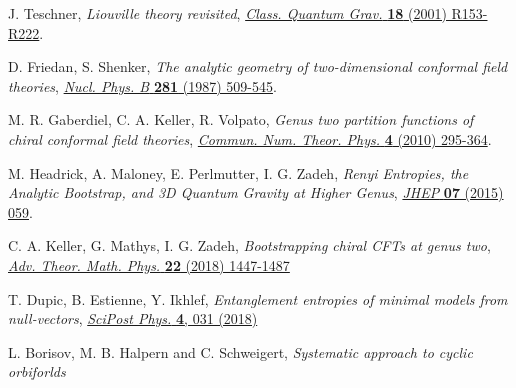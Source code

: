 \documentclass[a4paper,11pt]{article}
\begin{document}
\begin{thebibliography}{99}
 J. Teschner, \emph{Liouville theory revisited}, \href{https://doi.org/10.1088/0264-9381/18/23/201}{\emph{Class. Quantum Grav.} {\bf 18} (2001) R153-R222}.

 D. Friedan, S. Shenker, \emph{The analytic geometry of two-dimensional conformal field theories}, \href{https://doi.org/10.1016/0550-3213(87)90418-4}{\emph{Nucl. Phys. B} {\bf 281} (1987) 509-545}.

 M. R. Gaberdiel, C. A. Keller, R. Volpato, \emph{Genus two partition functions of chiral conformal field theories},
\href{https://dx.doi.org/10.4310/CNTP.2010.v4.n2.a2}{\emph{Commun. Num. Theor. Phys.} {\bf 4} (2010) 295-364}.

 M. Headrick, A. Maloney, E. Perlmutter, I. G. Zadeh, \emph{Renyi Entropies, the Analytic Bootstrap, and 3D Quantum Gravity at Higher Genus}, \href{https://doi.org/10.1007/JHEP07(2015)059}{\emph{JHEP} {\bf 07} (2015) 059}.

 C. A. Keller, G. Mathys, I. G. Zadeh, \emph{Bootstrapping chiral CFTs at genus two},
\href{https://dx.doi.org/10.4310/ATMP.2018.v22.n6.a3}{\emph{Adv. Theor. Math. Phys.} {\bf 22} (2018) 1447-1487}

 T. Dupic, B. Estienne, Y. Ikhlef, \emph{Entanglement entropies of minimal models from null-vectors}, 
\href{https://scipost.org/10.21468/SciPostPhys.4.6.031}{\emph{SciPost Phys.} {\bf 4}, 031 (2018)}

 L. Borisov, M. B. Halpern and C. Schweigert, \emph{Systematic approach to cyclic orbiforlds}




\end{thebibliography}
\end{document}
